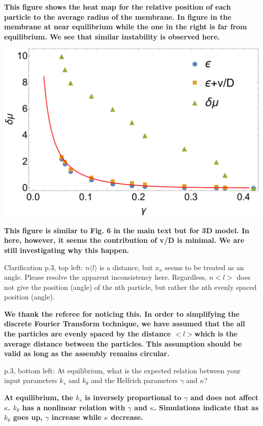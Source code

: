 \documentclass{letter}
\begin{document}
\begin{letter}{}
{\bf
This figure shows the heat map for the relative position of each particle to the average radius of the membrane. In figure in the membrane at near equilibrium while the one in the right is far from equilibrium. We see that similar instability is observed here.}

\begin{minipage}{\textwidth}
\includegraphics[scale=0.35]{boundsfor3Dmembrane.pdf}
\centering
\end{minipage}
{\bf
This figure is similar to Fig. 6 in the main text but for 3D model. In here, however, it seems the contribution of v/D is minimal. We are still investigating why this happen. }

Clarification 
p.3, top left: $n\langle l\rangle$ is a distance, but $x_n$ seems to be treated as an 
angle. Please resolve the apparent inconsistency here. Regardless, 
$n<l>$ does not give the position (angle) of the nth particle, but 
rather the nth evenly spaced position (angle). 

{\bf
We thank the referee for noticing this. In order to simplifying the discrete Fourier Transform technique, we have assumed that the all the particles are evenly spaced by the distance $<l> $which is the average distance between the particles. This assumption should be valid as long as the assembly remains circular.}

p.3, bottom left: At equilibrium, what is the expected relation 
between your input parameters $k_s$ and $k_{\theta}$ and the Helfrich 
parameters $\gamma$ and $\kappa$?

{\bf
At equilibrium, the $k_s$ is inversely proportional to $\gamma$ and does not affect $\kappa$. $k_\theta$ has a nonlinear relation with $\gamma$ and $\kappa$. Simulations indicate that as $k_\theta$ goes up, $\gamma$ increase while $\kappa$ decrease. }


\end{letter}
\end{document}
